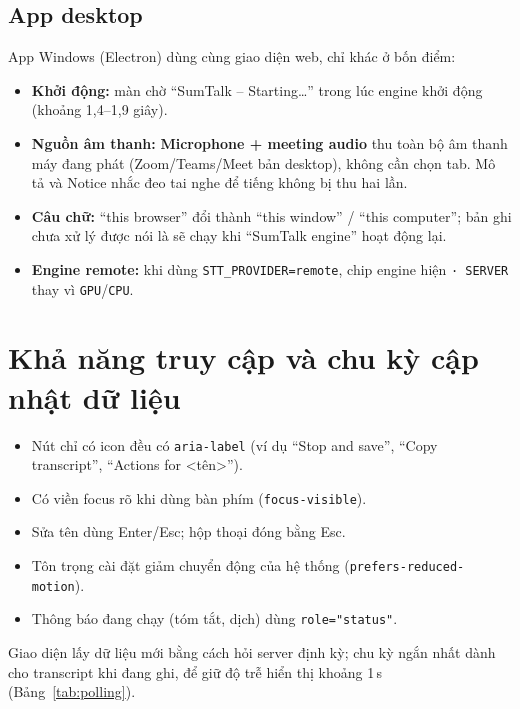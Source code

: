 \documentclass[12pt,a4paper]{report}
\newcommand{\ui}[1]{\textbf{#1}}
\begin{document}
\subsection{App desktop}

App Windows (Electron) dùng cùng giao diện web, chỉ khác ở bốn điểm:
\begin{itemize}
  \item \textbf{Khởi động:} màn chờ ``SumTalk -- Starting\ldots'' trong lúc engine khởi động (khoảng 1,4--1,9 giây).
  \item \textbf{Nguồn âm thanh:} \ui{Microphone + meeting audio} thu toàn bộ âm thanh máy đang phát (Zoom/Teams/Meet
        bản desktop), không cần chọn tab. Mô tả và Notice nhắc đeo tai nghe để tiếng không bị thu hai lần.
  \item \textbf{Câu chữ:} ``this browser'' đổi thành ``this window'' / ``this computer''; bản ghi chưa xử lý được nói
        là sẽ chạy khi ``SumTalk engine'' hoạt động lại.
  \item \textbf{Engine remote:} khi dùng \texttt{STT\_PROVIDER=remote}, chip engine hiện \texttt{· SERVER} thay vì
        \texttt{GPU}/\texttt{CPU}.
\end{itemize}

\section{Khả năng truy cập và chu kỳ cập nhật dữ liệu}

\begin{itemize}
  \item Nút chỉ có icon đều có \texttt{aria-label} (ví dụ ``Stop and save'', ``Copy transcript'', ``Actions for
        <tên>'').
  \item Có viền focus rõ khi dùng bàn phím (\texttt{focus-visible}).
  \item Sửa tên dùng Enter/Esc; hộp thoại đóng bằng Esc.
  \item Tôn trọng cài đặt giảm chuyển động của hệ thống (\texttt{prefers-reduced-motion}).
  \item Thông báo đang chạy (tóm tắt, dịch) dùng \texttt{role="status"}.
\end{itemize}

Giao diện lấy dữ liệu mới bằng cách hỏi server định kỳ; chu kỳ ngắn nhất dành cho transcript khi đang ghi, để giữ
độ trễ hiển thị khoảng 1\,s (Bảng~\ref{tab:polling}).
\end{document}
